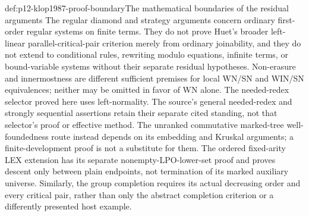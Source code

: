 \begin{proofboundary}{def:p12-klop1987-proof-boundary}{The mathematical boundaries of the residual arguments}
The regular diamond and strategy arguments concern ordinary first-order
regular systems on finite terms. They do not prove Huet's broader
left-linear parallel-critical-pair criterion merely from ordinary
joinability, and they do not extend to conditional rules, rewriting
modulo equations, infinite terms, or bound-variable systems without
their separate residual hypotheses. Non-erasure and innermostness are
different sufficient premises for local WN/SN and WIN/SN equivalences;
neither may be omitted in favor of WN alone.
The needed-redex selector proved here uses left-normality. The source's
general needed-redex and strongly sequential assertions retain their
separate cited standing, not that selector's proof or effective method.
The unranked commutative marked-tree well-foundedness route instead
depends on its embedding and Kruskal arguments; a finite-development
proof is not a substitute for them. The ordered fixed-arity LEX extension
has its separate nonempty-LPO-lower-set proof and proves descent only
between plain endpoints, not termination of its marked auxiliary universe.
Similarly, the group completion requires its actual decreasing
order and every critical pair, rather than only the abstract completion
criterion or a differently presented host example.
\end{proofboundary}
